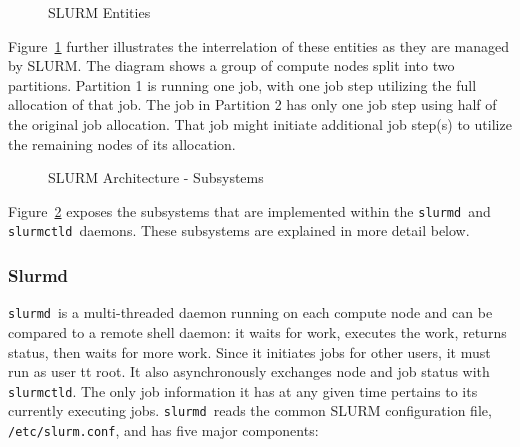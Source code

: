 \documentclass{article}
\newcommand{\slurmctld}{{\tt slurmctld}}
\newcommand{\slurmd}{{\tt slurmd}}
\begin{document}
\begin{figure}[tcb]
\centerline{}
\caption{SLURM Entities}
\label{entities}
\end{figure}

Figure~\ref{entities} further illustrates the interrelation of these
entities as they are managed by SLURM. The diagram shows a group of
compute nodes split into two partitions. Partition 1 is running one
job, with one job step utilizing the full allocation of that job.
The job in Partition 2 has only one job step using half of the original
job allocation.
That job might initiate additional job step(s) to utilize 
the remaining nodes of its allocation.

\begin{figure}[tb]
\centerline{}
\caption{SLURM Architecture - Subsystems}
\label{archdetail}
\end{figure}

Figure~\ref{archdetail} exposes the subsystems that are implemented
within the \slurmd\ and \slurmctld\ daemons.  These subsystems
are explained in more detail below.

\subsubsection{Slurmd}

\slurmd\ is a multi-threaded daemon running on each compute node and 
can be compared to a remote shell daemon:  
it waits for work, executes the work, returns status,
then waits for more work.  
Since it initiates jobs for other users, it must run as user {tt root}.
It also asynchronously exchanges node and job status with {\tt slurmctld}.  
The only job information it has at any given time pertains to its 
currently executing jobs.
\slurmd\ reads the common SLURM configuration file, {\tt /etc/slurm.conf},
and has five major components:
\end{document}
